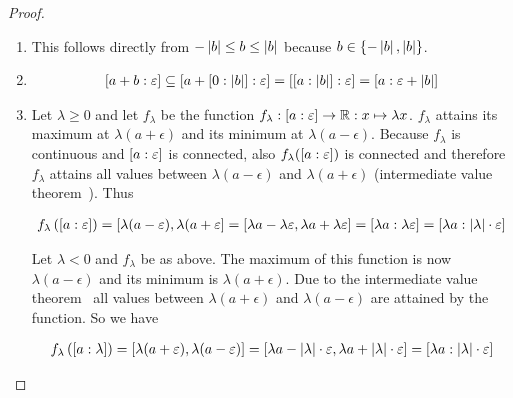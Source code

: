 \begin{proof}
\begin{enumerate}
    \item

      This follows directly from $-\abs{b} \le b \le \abs{b}$ because $b \in \{-\abs{b}, \abs{b}\}$.

    \item

      \begin{align}
        \an[\epsilon]{a+b} \subseteq \an[\epsilon]{a+\an[\abs{b}]{0}} = \an[\epsilon]{\an[\abs{b}]{a}} = \an[\epsilon+\abs{b}]{a}
      \end{align}

    \item
      Let $\lambda \ge 0$ and let $f_\lambda$ be the function $f_\lambda : \an[\epsilon]{a}\to\R:x\mapsto \lambda x$. $f_\lambda$ attains its maximum at $\lambda(a+\epsilon)$ and its minimum at $\lambda(a-\epsilon)$. Because $f_\lambda$ is continuous and $\an[\epsilon]{a}$ is connected, also $f_\lambda(\an[\epsilon]{a})$ is connected and therefore $f_\lambda$ attains all values between $\lambda(a-\epsilon)$ and $\lambda(a+\epsilon)$ (intermediate value theorem~\cite{wiki:intermediatevaluetheorem}). Thus

      \begin{align}
        f_\lambda\left(\an[\epsilon]{a}\right) = \interval{\lambda(a-\epsilon)}{\lambda(a+\epsilon} = \interval{\lambda a - \lambda \epsilon}{\lambda a+\lambda \epsilon} = \an[\lambda \epsilon]{\lambda a} = \an[\abs{\lambda}\cdot \epsilon]{\lambda a}
      \end{align}

      Let $\lambda < 0$ and $f_\lambda$ be as above. The maximum of this function is now $\lambda (a-\epsilon)$ and its minimum is $\lambda (a+\epsilon)$. Due to the intermediate value theorem~\cite{wiki:intermediatevaluetheorem} all values between $\lambda(a+\epsilon)$ and $\lambda(a-\epsilon)$ are attained by the function. So we have

      \begin{align}
        f_\lambda\left(\an[\lambda]{a}\right) = \interval{\lambda(a+\epsilon)}{\lambda(a-\epsilon)} = \interval{\lambda a -\abs{\lambda}\cdot \epsilon}{\lambda a + \abs{\lambda}\cdot \epsilon} = \an[\abs{\lambda}\cdot \epsilon]{\lambda a}
      \end{align}

 \end{enumerate}
\end{proof}



